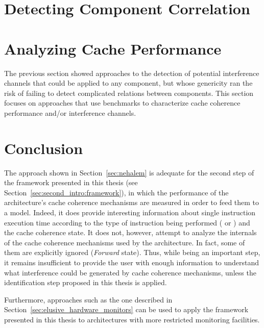 \stopallthesefloats{}
\section{Detecting Component Correlation}
\stopallthesefloats{}

\stopallthesefloats{}

\stopallthesefloats{}
\section{Analyzing Cache Performance}
The previous section showed approaches to the detection of potential
interference channels that could be applied to any component, but whose
genericity ran the risk of failing to detect complicated relations between
components. This section focuses on approaches that use benchmarks to
characterize cache coherence performance and/or interference channels.
\stopallthesefloats{}

\stopallthesefloats{}

\stopallthesefloats{}

\stopallthesefloats{}
\section{Conclusion}
The approach shown in Section~\ref{sec:nehalem} is adequate for the second step
of the framework presented in this thesis (see
Section~\ref{sec:second_intro:framework}), in which the performance of the
architecture's cache coherence mechanisms are measured in order to feed them to
a model. Indeed, it does provide interesting information about single
instruction execution time according to the type of instruction being performed
(\loadinstr{} or \storeinstr{}) and the cache coherence state. It does not,
however, attempt to analyze the internals of the cache coherence mechanisms used
by the architecture. In fact, some of them are explicitly ignored
(\textit{Forward} state). Thus, while being an important step, it remains
insufficient to provide the user with enough information to understand what
interference could be generated by cache coherence mechanisms, unless the
identification step proposed in this thesis is applied.

Furthermore, approaches such as the one described in
Section~\ref{sec:elusive_hardware_monitors} can be used to apply the framework
presented in this thesis to architectures with more restricted monitoring
facilities.
